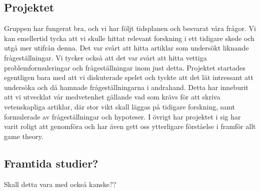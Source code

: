 \subsection{Projektet}
Gruppen har fungerat bra, och vi har följt tidsplanen och besvarat våra frågor. Vi kan emellertid tycka att vi skulle hittat relevant forskning i ett tidigare skede och utgå mer utifrån denna. Det var svårt att hitta artiklar som undersökt liknande frågeställningar. Vi tycker också att det var svårt att hitta vettiga problemformuleringar och frågeställningar inom just detta. Projektet startades egentligen bara med att vi diskuterade spelet och tyckte att det lät intressant att undersöka och då hamnade frågeställningarna i andrahand. Detta har inneburit att vi utvecklat vår medvetenhet gällande vad som krävs för att skriva vetenskapliga artiklar, där stor vikt skall läggas på tidigare forskning, samt formulerade av frågeställningar och hypoteser. I övrigt har projektet i sig har varit roligt att genomföra och har även gett oss ytterligare förståelse i framför allt game theory. 

\subsection{Framtida studier?}
Skall detta vara med också kanske??